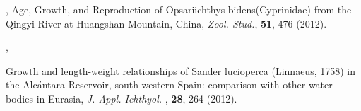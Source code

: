 \begin{thebibliography}{100}
, {Age, Growth, and Reproduction of Opsariichthys bidens(Cyprinidae) from the Qingyi River at Huangshan Mountain, China}, \textit{Zool. Stud.}, \textbf{51}, 476 {(2012)}.
%

, {Growth and length-weight relationships of Sander lucioperca (Linnaeus, 1758) in the Alc{\'{a}ntara Reservoir, south-western Spain: comparison with other water bodies in Eurasia}, \textit{J. Appl. Ichthyol. }, \textbf{28}, 264 {(2012)}.
%

%

%
%
%

%


}
\end{thebibliography}
